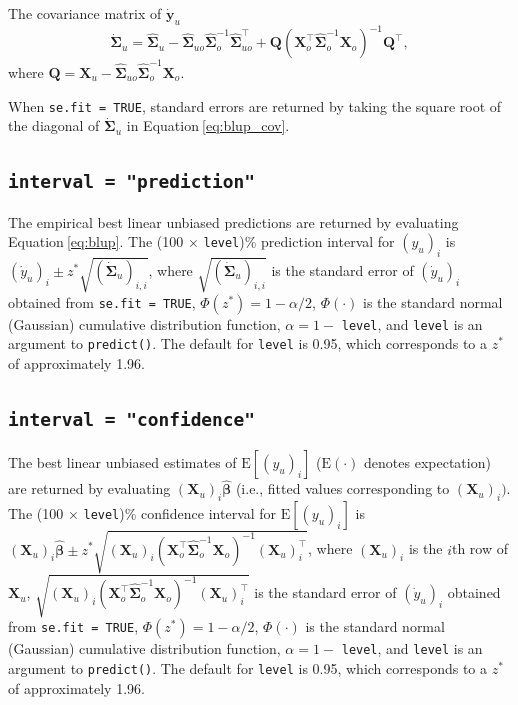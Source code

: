 \documentclass{article}
\begin{document}
The covariance matrix of \(\mathbf{\dot{y}}_u\)
\begin{equation}\label{eq:blup_cov}
  \dot{\boldsymbol{\Sigma}}_u = \hat{\boldsymbol{\Sigma}}_u - \hat{\boldsymbol{\Sigma}}_{uo} \hat{\boldsymbol{\Sigma}}^{-1}_o \hat{\boldsymbol{\Sigma}}^\top_{uo} + \mathbf{Q}(\mathbf{X}_o^\top \hat{\boldsymbol{\Sigma}}_o^{-1} \mathbf{X}_o)^{-1}\mathbf{Q}^\top ,
\end{equation} where
\(\mathbf{Q} = \mathbf{X}_u - \hat{\boldsymbol{\Sigma}}_{uo} \hat{\boldsymbol{\Sigma}}^{-1}_o \mathbf{X}_o\).

When \texttt{se.fit\ =\ TRUE}, standard errors are returned by taking
the square root of the diagonal of \(\dot{\boldsymbol{\Sigma}}_u\) in
Equation\(~\)\ref{eq:blup_cov}.

\hypertarget{interval-prediction}{%
\subsection{\texorpdfstring{\texttt{interval\ =\ "prediction"}}{interval = "prediction"}}\label{interval-prediction}}

The empirical best linear unbiased predictions are returned by
evaluating Equation\(~\)\ref{eq:blup}. The (100 \(\times\)
\texttt{level})\% prediction interval for \((y_u)_i\) is
\((\dot{y}_u)_i \pm z^* \sqrt{(\dot{\boldsymbol{\Sigma}}_u)_{i, i}}\),
where \(\sqrt{(\dot{\boldsymbol{\Sigma}}_u)_{i, i}}\) is the standard
error of \((\dot{y}_u)_i\) obtained from \texttt{se.fit\ =\ TRUE},
\(\Phi(z^*) = 1 - \alpha / 2\), \(\Phi(\cdot)\) is the standard normal
(Gaussian) cumulative distribution function, \(\alpha = 1 -\)
\texttt{level}, and \texttt{level} is an argument to \texttt{predict()}.
The default for \texttt{level} is 0.95, which corresponds to a \(z^*\)
of approximately 1.96.

\hypertarget{interval-confidence}{%
\subsection{\texorpdfstring{\texttt{interval\ =\ "confidence"}}{interval = "confidence"}}\label{interval-confidence}}

The best linear unbiased estimates of \(\text{E}[(y_u)_i]\)
(\(\text{E}(\cdot)\) denotes expectation) are returned by evaluating
\((\mathbf{X}_u)_i \hat{\boldsymbol{\beta}}\) (i.e., fitted values
corresponding to \((\mathbf{X}_u)_i)\). The (100 \(\times\)
\texttt{level})\% confidence interval for \(\text{E}[(y_u)_i]\) is
\((\mathbf{X}_u)_i \hat{\boldsymbol{\beta}} \pm z^* \sqrt{(\mathbf{X}_u)_i (\mathbf{X}^\top_o \hat{\boldsymbol{\Sigma}}_o^{-1} \mathbf{X}_o)^{-1} (\mathbf{X}_u)_i^\top}\),
where \((\mathbf{X}_u)_i\) is the \(i\)th row of \(\mathbf{X}_u\),
\(\sqrt{(\mathbf{X}_u)_i (\mathbf{X}^\top_o \hat{\boldsymbol{\Sigma}}_o^{-1} \mathbf{X}_o)^{-1} (\mathbf{X}_u)_i^\top}\)
is the standard error of \((\dot{y}_u)_i\) obtained from
\texttt{se.fit\ =\ TRUE}, \(\Phi(z^*) = 1 - \alpha / 2\),
\(\Phi(\cdot)\) is the standard normal (Gaussian) cumulative
distribution function, \(\alpha = 1 -\) \texttt{level}, and
\texttt{level} is an argument to \texttt{predict()}. The default for
\texttt{level} is 0.95, which corresponds to a \(z^*\) of approximately
1.96.
\end{document}
